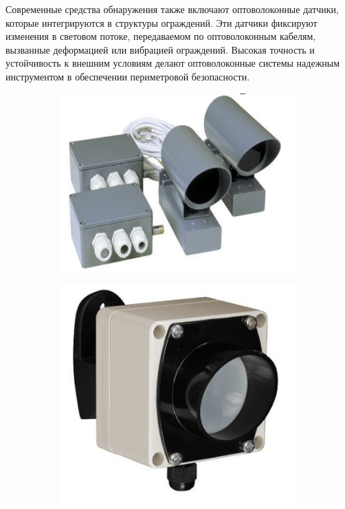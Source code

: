 Современные средства обнаружения также включают оптоволоконные датчики, которые интегрируются в структуры ограждений. Эти датчики фиксируют изменения в световом потоке, передаваемом по оптоволоконным кабелям, вызванные деформацией или вибрацией ограждений. Высокая точность и устойчивость к внешним условиям делают оптоволоконные системы надежным инструментом в обеспечении периметровой безопасности.

\begin{figure}[!htbp]
	\begin{subfigure}[t]{\dimexpr.5\linewidth-1.3em\relax} %
		\includegraphics[height=0.20\textheight,valign=t]{my_folder/images//infr.png} %
	\end{subfigure}
	\begin{subfigure}[t]{\dimexpr.5\linewidth-1.3em\relax}%
		\includegraphics[height=0.20\textheight,valign=t]{my_folder/images//izvesh.png}%

\end{subfigure}
\end{figure}
